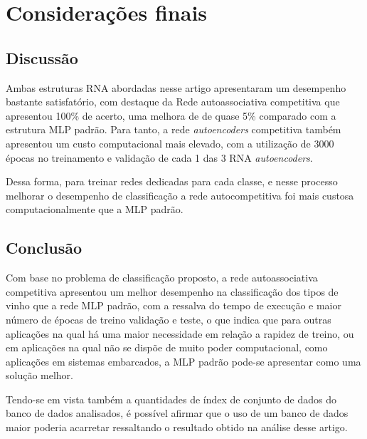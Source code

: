 \section{Considerações finais}

\subsection{Discussão}

Ambas estruturas RNA abordadas nesse artigo apresentaram um desempenho bastante satisfatório, com destaque da Rede autoassociativa competitiva que apresentou 100\% de acerto, uma melhora de de quase 5\% comparado com a estrutura MLP padrão. Para tanto, a rede \textit{autoencoders}  competitiva também apresentou um custo computacional mais elevado, com a utilização de 3000 épocas no treinamento e validação de cada 1 das 3 RNA \textit{autoencoders}.

Dessa forma, para treinar redes dedicadas para cada classe, e nesse processo melhorar o desempenho de classificação a rede autocompetitiva foi mais custosa computacionalmente que a MLP padrão.


\subsection{Conclusão}

Com base no problema de classificação proposto, a rede autoassociativa competitiva apresentou um melhor desempenho na classificação dos tipos de vinho que a rede MLP padrão, com a ressalva do tempo de execução e maior número de épocas de treino validação e teste, o que indica que para outras aplicações na qual há uma maior necessidade em relação a rapidez de treino, ou em aplicações na qual não se dispõe de muito poder computacional, como aplicações em sistemas embarcados, a MLP padrão pode-se apresentar como uma solução melhor.

Tendo-se em vista também a quantidades de índex de conjunto de dados do banco de dados analisados, é possível afirmar que o uso de um banco de dados maior poderia acarretar ressaltando o resultado obtido na análise desse artigo.
